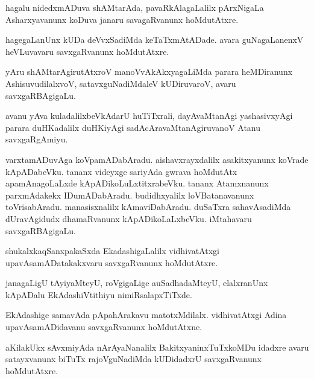 \documentclass{article}
\begin{document}
\begin{mn}%
hagalu nidedxmADuva shAMtarAda, pavaRkAlagaLalilx pArxNigaLa Asharxyavanunx koDuva janaru 
savagaRvanunx hoMdutAtxre.
\end{mn}

\begin{mn}%
hagegaLanUnx kUDa deVvxSadiMda keTaTxmAtADade. avara guNagaLanenxV heVLuvavaru 
savxgaRvanunx hoMdutAtxre.
\end{mn}

\begin{mn}%
yAru shAMtarAgirutAtxroV manoVvAkAkxyagaLiMda parara heMDiranunx AshisuvudilalxvoV, 
satavxguNadiMdaleV kUDiruvaroV, avaru savxgaRBAgigaLu.
\end{mn}

\begin{mn}%
avanu yAva kuladalilxbeVkAdarU huTiTxrali, dayAvaMtanAgi yashasivxyAgi parara duHKadalilx 
duHKiyAgi sadAcAravaMtanAgiruvanoV Atanu savxgaRgAmiyu.
\end{mn}

\begin{mn}%
varxtamADuvAga koVpamADabAradu. aishavxrayxdalilx asakitxyanunx koVrade kApADabeVku. 
tananx videyxge sariyAda gwrava hoMdutAtx apamAnagoLaLxde kApADikoLuLxtitxrabeVku. tananx 
Atamxnanunx parxmAdakekx IDumADabAradu. budidhxyalilx loVBatanavanunx toVrisabAradu. 
manasisxnalilx kAmaviDabAradu. duSaTxra sahavAsadiMda dUravAgidudx dhamaRvanunx 
kApADikoLaLxbeVku. iMtahavaru savxgaRBAgigaLu.
\end{mn}


\begin{mn}%
shukalxkaqSanxpakaSxda EkadashigaLalilx vidhivatAtxgi upavAsamADatakakxvaru savxgaRvanunx 
hoMdutAtxre.
\end{mn}

\begin{mn}%
janagaLigU tAyiyaMteyU, roVgigaLige auSadhadaMteyU, elalxranUnx kApADalu EkAdashiVtithiyu 
nimiRsalapxTiTxde.
\end{mn}

\begin{mn}%
EkAdashige samavAda pApahArakavu matotxMdilalx. vidhivatAtxgi Adina upavAsamADidavanu 
savxgaRvanunx hoMdutAtxne.
\end{mn}

\begin{mn}%
aKilakUkx sAvxmiyAda nArAyaNanalilx BakitxyaninxTuTxkoMDu idadxre avaru satayxvanunx 
biTuTx rajoVguNadiMda kUDidadxrU savxgaRvanunx hoMdutAtxre.
\end{mn}
\end{document}
